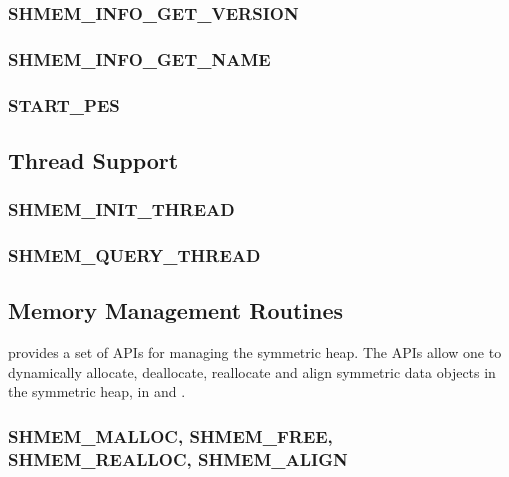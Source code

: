 \documentclass[10pt]{book}
\begin{document}
\subsubsection{\textbf{SHMEM\_INFO\_GET\_VERSION}}\label{subsec:shmem_info_get_version}


\subsubsection{\textbf{SHMEM\_INFO\_GET\_NAME}}\label{subsec:shmem_info_get_name}


\subsubsection{\textbf{START\_PES}}\label{subsec:start_pes}


\subsection{Thread Support}
\label{subsec:thread_support}


\subsubsection{\textbf{SHMEM\_INIT\_THREAD}}
\label{subsec:shmem_init_thread}


\subsubsection{\textbf{SHMEM\_QUERY\_THREAD}}
\label{subsec:shmem_query_thread}



\subsection{Memory Management Routines}
\label{sec:mem_routines}
\openshmem provides a set of \acp{API} for managing the symmetric heap. The
\acp{API} allow one to dynamically allocate, deallocate, reallocate and align
symmetric data objects in the symmetric heap, in \Cstd and \Fortran.

\subsubsection{\textbf{SHMEM\_MALLOC, SHMEM\_FREE, SHMEM\_REALLOC, SHMEM\_ALIGN}}\label{subsec:shfree}

\end{document}
